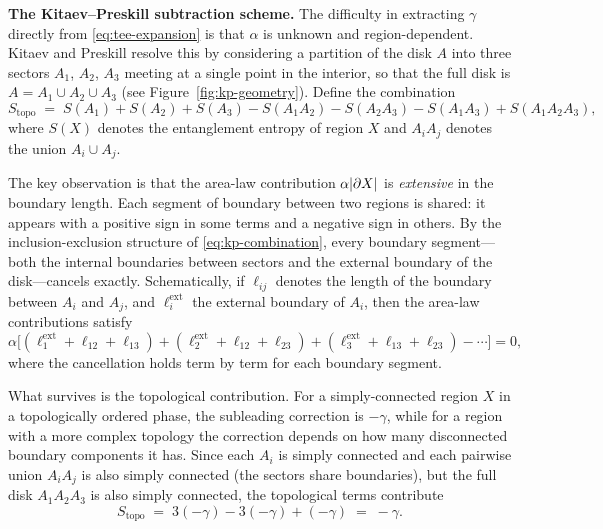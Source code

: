 \medskip
\noindent\textbf{The Kitaev--Preskill subtraction scheme.}
The difficulty in extracting $\gamma$ directly from \eqref{eq:tee-expansion} is that $\alpha$ is unknown and region-dependent.  Kitaev and Preskill resolve this by considering a partition of the disk $A$ into three sectors $A_1$, $A_2$, $A_3$ meeting at a single point in the interior, so that the full disk is $A = A_1 \cup A_2 \cup A_3$ (see Figure~\ref{fig:kp-geometry}).  Define the combination
\begin{equation}\label{eq:kp-combination}
    S_{\mathrm{topo}} \;=\; S(A_1) + S(A_2) + S(A_3) - S(A_1 A_2) - S(A_2 A_3) - S(A_1 A_3) + S(A_1 A_2 A_3),
\end{equation}
where $S(X)$ denotes the entanglement entropy of region $X$ and $A_i A_j$ denotes the union $A_i \cup A_j$.

The key observation is that the area-law contribution $\alpha |\partial X|$ is \emph{extensive} in the boundary length.  Each segment of boundary between two regions is shared: it appears with a positive sign in some terms and a negative sign in others.  By the inclusion-exclusion structure of \eqref{eq:kp-combination}, every boundary segment---both the internal boundaries between sectors and the external boundary of the disk---cancels exactly.  Schematically, if $\ell_{ij}$ denotes the length of the boundary between $A_i$ and $A_j$, and $\ell_i^{\mathrm{ext}}$ the external boundary of $A_i$, then the area-law contributions satisfy
\begin{equation}\label{eq:boundary-cancellation}
    \alpha\bigl[(\ell_1^{\mathrm{ext}} + \ell_{12} + \ell_{13}) + (\ell_2^{\mathrm{ext}} + \ell_{12} + \ell_{23}) + (\ell_3^{\mathrm{ext}} + \ell_{13} + \ell_{23}) - \cdots \bigr] = 0,
\end{equation}
where the cancellation holds term by term for each boundary segment.

What survives is the topological contribution.  For a simply-connected region $X$ in a topologically ordered phase, the subleading correction is $-\gamma$, while for a region with a more complex topology the correction depends on how many disconnected boundary components it has.  Since each $A_i$ is simply connected and each pairwise union $A_i A_j$ is also simply connected (the sectors share boundaries), but the full disk $A_1 A_2 A_3$ is also simply connected, the topological terms contribute
\begin{equation}\label{eq:topo-extraction}
    S_{\mathrm{topo}} \;=\; 3(-\gamma) - 3(-\gamma) + (-\gamma) \;=\; -\gamma.
\end{equation}

